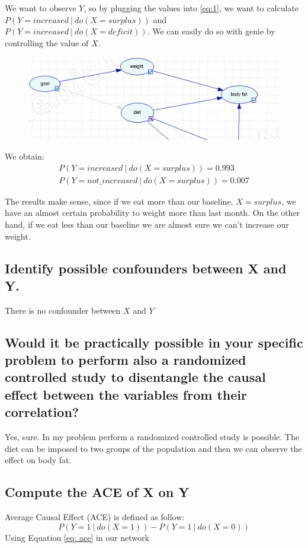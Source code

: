 \documentclass[11pt]{article}
\newcommand\given[1][]{\:#1\vert\:}
\begin{document}
We want to observe $Y$, so by plugging the values into \ref{eq:1}, we want to calculate
$P(Y=increased \given do(X=surplus))$ and $P(Y=increased \given do(X=deficit))$. We can easily do so with genie by controlling the value of $X$.

\begin{figure}[H]
\includegraphics[width=\textwidth]{images/control_value/1}
\end{figure}

We obtain:
\begin{align}
P(Y=increased \given do(X=surplus)) = 0.993 \\
P(Y=not\_increased \given do(X=surplus)) = 0.007
\end{align}

The results make sense, since if we eat more than our baseline, $X=surplus$, we have an almost certain probability to weight more than last month. On the other hand, if we eat less than our baseline we are almost sure we can't increase our weight.

\subsection{Identify possible confounders between X and Y.}
There is no confounder between $X$ and $Y$
\subsection{Would it be practically possible in your specific problem to perform also a randomized controlled study to disentangle the causal effect between the variables from their correlation?
}
Yes, sure. In my problem perform a randomized controlled study is possible. The diet can be imposed to two groups of the population and then we can observe the effect on body fat.

\subsection{Compute the ACE of X on Y}
Average Causal Effect (ACE) is defined as follow:
\begin{equation}
P(Y=1 \given do(X=1)) - P(Y=1 \given do(X=0)) 
\label{eq: ace}
\end{equation}
Using Equation \ref{eq: ace} in our network
\end{document}
